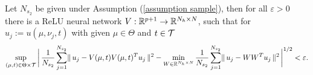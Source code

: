 \begin{lemma} \label{lemma: optimal projection error}
    Let $N_{s_2}$ be given under Assumption (\ref{assumption sample}), then for all $\varepsilon > 0$ there is a ReLU neural network
    $V: \mathbb{R}^{p+1} \to \mathbb{R}^{N_h \times N}$, such that for $u_j := u(\mu, \nu_j, t)$ with given $\mu \in \Theta$ and $t \in \mathcal{T}$
    \begin{equation*}
        \sup\limits_{(\mu, t) \in \Theta \times \mathcal{T}} \bigg\vert \, \frac{1}{N_{s_2}} \sum_{j=1}^{N_{s_2}} \lVert \, u_j - V(\mu, t) V(\mu, t)^T u_j \, \rVert^2 \\
        - \min\limits_{W \in \mathbb{R}^{N_h \times N}} \frac{1}{N_{s_2}} \sum_{j = 1}^{N_{s_2}} \lVert \, u_j - W W^T u_j \, \rVert^2 \, \bigg\vert^{1/2} < \varepsilon.
    \end{equation*}
\end{lemma}
